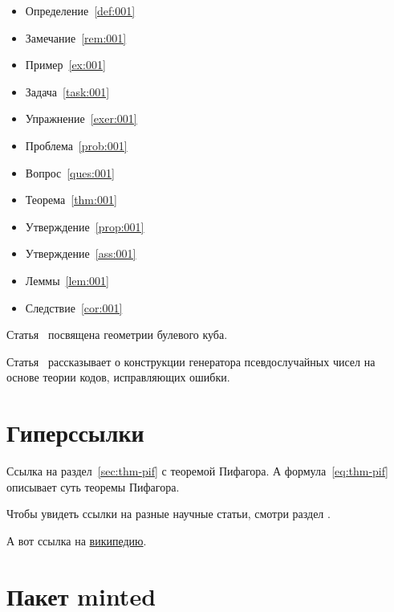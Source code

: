 \documentclass[colorthm, toc]{../civarticle}
\begin{document}
\begin{itemize}
\item Определение~\ref{def:001}
\item Замечание~\ref{rem:001}
\item Пример~\ref{ex:001}
\item Задача~\ref{task:001}
\item Упражнение~\ref{exer:001}
\item Проблема~\ref{prob:001}
\item Вопрос~\ref{ques:001}
\item Теорема~\ref{thm:001}
\item Утверждение~\ref{prop:001}
\item Утверждение~\ref{ass:001}
\item Леммы~\ref{lem:001}
\item Следствие~\ref{cor:001}
\end{itemize}

Статья~\cite{ahlswede1977} посвящена геометрии булевого куба.

Статья~\cite{ahmed2013} рассказывает о конструкции генератора
псевдослучайных чисел на основе теории кодов, исправляющих ошибки.


\section{Гиперссылки}
\label{sec:hyper}

Ссылка на раздел~\ref{sec:thm-pif} с теоремой Пифагора.  А
формула~\eqref{eq:thm-pif} описывает суть теоремы Пифагора.

Чтобы увидеть ссылки на разные научные статьи, смотри раздел
\hyperref[sec:ref-to-articles]{}.

А вот ссылка на \href{https://ru.wikipedia.org}{википедию}.


\section{Пакет minted}
\label{sec:minted}
\if \MINTED\empty
\else \inputminted{python}{code.py} \fi
\end{document}
